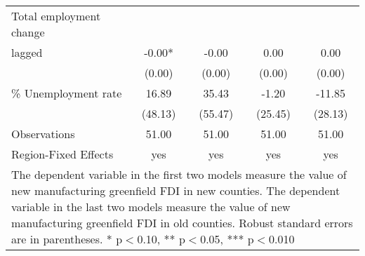 \begin{table}[!htbp]
\begin{tabular}{l*{4}{c}}
Total employment change \\ lagged&       -0.00*  &       -0.00   &        0.00   &        0.00   \\
                    &      (0.00)   &      (0.00)   &      (0.00)   &      (0.00)   \\
\% Unemployment rate&       16.89   &       35.43   &       -1.20   &      -11.85   \\
                    &     (48.13)   &     (55.47)   &     (25.45)   &     (28.13)   \\
\hline
Observations        &       51.00   &       51.00   &       51.00   &       51.00   \\
Region-Fixed Effects&         yes   &         yes   &         yes   &         yes   \\
\hline\hline
\multicolumn{5}{p{\linewidth}}{\footnotesize The dependent variable in the first two models measure the value of new manufacturing greenfield FDI in new counties. The dependent variable in the last two models measure the value of new manufacturing greenfield FDI in old counties. Robust standard errors are in parentheses. * p$<$0.10, ** p$<$0.05, *** p$<$0.010}\\
\end{tabular}
\end{table}
